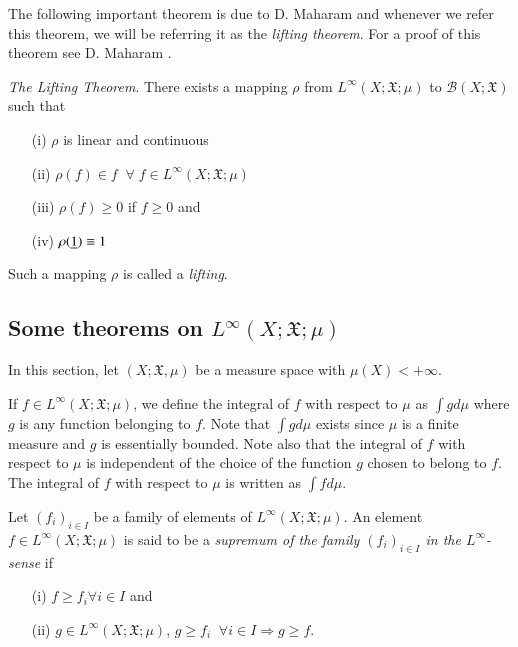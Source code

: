 The following important theorem is due to D. Maharam and whenever we
refer this theorem, we will be referring it as the {\em lifting
  theorem}. For a proof of this theorem see D. Maharam  \cite{key1}. 

\begin{theorem*}[D. Maharam]\pageoriginale
{\em The Lifting Theorem}. There exists a mapping $\rho$ from
$L^\infty(X; \mathfrak{X}; \mu)$ to $\mathscr{B}(X; \mathfrak{X})$
such that 
\begin{itemize}
\item[{\rm (i)}] $\rho$ is linear and continuous

\item[{\rm (ii)}] $\rho(f) \in f \;\; \forall \; f \in L^\infty (X;
  \mathfrak{X}; \mu)$ 

\item[{\rm (iii)}] $\rho (f) \geq 0$ if $f \geq 0$ and 

\item[{\rm (iv)}] $\rho(\underline{1}) \equiv 1$
\end{itemize}

Such a mapping $\rho$ is called a {\em lifting}. 
\end{theorem*}


\subsection{Some theorems on $L^\infty(X;\mathfrak{X};\mu)$}\label{part1:chap3:sec2.3}

In this section, let $(X; \mathfrak{X}, \mu)$ be a measure space with
$\mu (X) < + \infty$. 

If $f\in L^\infty (X; \mathfrak{X};\mu)$, we define the integral of
$f$ with respect to $\mu$ as $\int g d\mu$ where $g$ is any function
belonging to $f$. Note that $\int g d \mu$ exists since $\mu$ is a
finite measure and $g$ is essentially bounded. Note also that the
integral of $f$ with respect to $\mu$ is independent of the choice of
the function $g$ chosen to belong to $f$. The integral of $f$ with
respect to $\mu$ is written as $\int f d \mu$. 

\begin{defn}\label{part1:chap3:def25}
Let $(f_i)_{i \in I}$ be a family of elements of $L^\infty (X;
\mathfrak{X}; \mu)$. An element $f \in L^\infty (X; \mathfrak{X};
\mu)$ is said to be a {\em supremum of the family $(f_i)_{i \in I}$ in
the $L^\infty$-sense} if
\begin{itemize}
\item[{\rm (i)}] $f \geq f_i \forall i \in I$ and 

\item[{\rm (ii)}] $g \in L^\infty (X; \mathfrak{X}; \mu)$, $g \geq f_i
 \;\;  \forall i \in I \Rightarrow g \geq f$. 
\end{itemize}
\end{defn}

